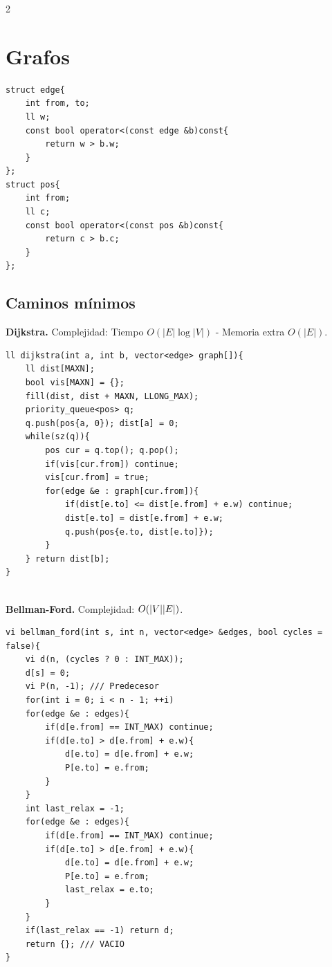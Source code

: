 \documentclass[10pt,spanish,mexico]{article}
\numberwithin{equation}{section}
\begin{document}
\begin{multicols}{2}
\vspace{-1.2\baselineskip}
\hrulefill
\section{Grafos}
\begin{verbatim}
struct edge{
    int from, to;
    ll w;
    const bool operator<(const edge &b)const{
        return w > b.w;
    }
};
struct pos{
    int from;
    ll c;
    const bool operator<(const pos &b)const{
        return c > b.c;
    }
};
\end{verbatim}

\vspace{-\baselineskip}
\hrulefill
\subsection{Caminos mínimos}
\textbf{Dijkstra.} Complejidad: Tiempo $O(|E| \log |V|)$ - Memoria extra $O(|E|)$.
\begin{verbatim}
ll dijkstra(int a, int b, vector<edge> graph[]){
    ll dist[MAXN];
    bool vis[MAXN] = {};
    fill(dist, dist + MAXN, LLONG_MAX);
    priority_queue<pos> q;
    q.push(pos{a, 0}); dist[a] = 0;
    while(sz(q)){
        pos cur = q.top(); q.pop();
        if(vis[cur.from]) continue;
        vis[cur.from] = true;
        for(edge &e : graph[cur.from]){
            if(dist[e.to] <= dist[e.from] + e.w) continue;
            dist[e.to] = dist[e.from] + e.w;
            q.push(pos{e.to, dist[e.to]});
        }
    } return dist[b];
}
\end{verbatim}

\vspace{-1.2\baselineskip}
\hrulefill\\
\textbf{Bellman-Ford.} Complejidad: $O(\abs{V}\abs{E})$.
\begin{verbatim}
vi bellman_ford(int s, int n, vector<edge> &edges, bool cycles = false){
    vi d(n, (cycles ? 0 : INT_MAX));
    d[s] = 0;
    vi P(n, -1); /// Predecesor
    for(int i = 0; i < n - 1; ++i)
    for(edge &e : edges){
        if(d[e.from] == INT_MAX) continue;
        if(d[e.to] > d[e.from] + e.w){
            d[e.to] = d[e.from] + e.w;
            P[e.to] = e.from;
        }
    }
    int last_relax = -1;
    for(edge &e : edges){
        if(d[e.from] == INT_MAX) continue;
        if(d[e.to] > d[e.from] + e.w){
            d[e.to] = d[e.from] + e.w;
            P[e.to] = e.from;
            last_relax = e.to;
        }
    }
    if(last_relax == -1) return d;
    return {}; /// VACIO
}
\end{verbatim}


\end{multicols}
\end{document}
